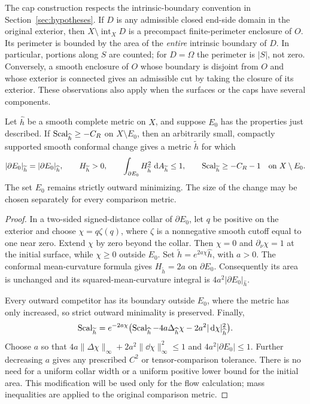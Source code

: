 The cap construction respects the intrinsic-boundary convention in
Section~\ref{sec:hypotheses}.  If $D$ is any admissible closed end-side
domain in the original exterior, then
$X\setminus\operatorname{int}_X D$ is a precompact finite-perimeter
enclosure of $O$.  Its perimeter is bounded by the area of the
\emph{entire} intrinsic boundary of $D$.  In particular, portions along
$S$ are counted; for $D=\Omega$ the perimeter is $|S|$, not zero.
Conversely, a smooth enclosure of $O$ whose boundary is disjoint from
$O$ and whose exterior is connected gives an admissible cut by taking
the closure of its exterior.  These observations also apply when the
surfaces or the caps have several components.

\begin{lemma}\label{lem:flow-initial-adjustment}
Let $\widehat h$ be a smooth complete metric on $X$, and suppose $E_0$
has the properties just described.  If
$\operatorname{Scal}_{\widehat h}\ge-C_R$ on $X\setminus E_0$, then an arbitrarily
small, compactly supported smooth conformal change gives a metric
$\widetilde h$ for which
\begin{equation}\label{eq:flow-initial-adjustment}
 |\partial E_0|_{\widetilde h}=|\partial E_0|_{\widehat h},\qquad
 H_{\widetilde h}>0,\qquad
 \int_{\partial E_0}H_{\widetilde h}^{2}\,\mathop{}\!\mathrm d A_{\widetilde h}\le1,
 \qquad \operatorname{Scal}_{\widetilde h}\ge-C_R-1
 \quad\hbox{on }X\setminus E_0.
\end{equation}
The set $E_0$ remains strictly outward minimizing.  The size of the
change may be chosen separately for every comparison metric.
\end{lemma}

\begin{proof}
In a two-sided signed-distance collar of $\partial E_0$, let $q$ be
positive on the exterior and choose
$\chi=q\zeta(q)$, where $\zeta$ is a nonnegative smooth cutoff equal to
one near zero.  Extend $\chi$ by zero beyond the collar.  Then
$\chi=0$ and $\partial_\nu\chi=1$ at the initial surface, while
$\chi\ge0$ outside $E_0$.  Set
$\widetilde h=e^{2a\chi}\widehat h$, with $a>0$.  The conformal
mean-curvature formula gives $H_{\widetilde h}=2a$ on $\partial E_0$.
Consequently its area is unchanged and its squared-mean-curvature
integral is $4a^2|\partial E_0|_{\widehat h}$.

Every outward competitor has its boundary outside $E_0$, where the
metric has only increased, so strict outward minimality is preserved.
Finally,
\begin{equation}\label{eq:flow-conformal-scalar}
 \operatorname{Scal}_{\widetilde h}
 =e^{-2a\chi}\bigl(\operatorname{Scal}_{\widehat h}
       -4a\Delta_{\widehat h}\chi
       -2a^2|\mathop{}\!\mathrm d\chi|_{\widehat h}^2\bigr).
\end{equation}
Choose $a$ so that
$4a\|\Delta\chi\|_\infty+2a^2\|\dd\chi\|_\infty^2\le1$ and
$4a^2|\partial E_0|\le1$.  Further decreasing $a$ gives any prescribed
$C^2$ or tensor-comparison tolerance.  There is no need for a uniform
collar width or a uniform positive lower bound for the initial area.
This modification will be used only for the flow calculation; mass
inequalities are applied to the original comparison metric.
\end{proof}

